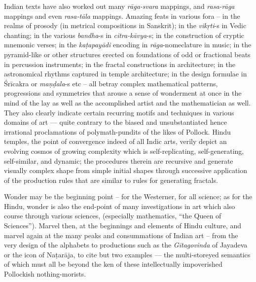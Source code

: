 Indian texts have also worked out many \textsl{rāga-svara} mappings, and \textsl{rasa-rāga} mappings and even \textsl{rasa-tāla} mappings. Amazing feats in various fora -- in the realms of prosody (in metrical compositions in Sanskrit); in the \textsl{vikṛti}-s in Vedic chanting; in the various \textsl{bandha}-s in \textsl{citra-kāvya}-s; in the construction of cryptic mnemonic verses; in the \textsl{kaṭapayādi} encoding in \textsl{rāga}-nomeclature in music; in the pyramid-like or other structures erected on foundations of odd or fractional beats in percussion instruments; in the fractal constructions in architecture; in the  astronomical rhythms captured in temple architecture; in the design formulae in Śrīcakra or \textsl{maṇḍala}-s etc -- all betray complex mathematical patterns, progressions and symmetries that arouse a sense of wonderment at once in the mind of the lay as well as the accomplished artist and the mathematician as well. They also clearly indicate certain recurring motifs and techniques in various domains of art --- quite contrary to the biased and unsubstantiated hence irrational proclamations of polymath-pundits of the likes of Pollock. Hindu temples, the point of convergence indeed of all Indic arts, verily depict an evolving cosmos of growing complexity which is self-replicating, self-generating, self-similar, and dynamic; the procedures therein are recursive and generate visually complex shape from simple initial shapes through successive application of the production rules that are similar to rules for generating fractals.

Wonder may be the beginning point -- for the Westerner, for all science; as for the Hindu, wonder is also the end-point of many investigations in art which also course through various sciences, (especially mathematics, ``the Queen of Sciences''). Marvel then, at the beginnings and elements of Hindu culture, and marvel again at the many peaks and consummations of Indian art – from the very design of the alphabets to productions such as the \textsl{Gītagovinda} of Jayadeva or the icon of Naṭarāja, to cite but two examples --- the multi-storeyed semantics of which must all be beyond the ken of these intellectually impoverished Pollockish nothing-morists.

